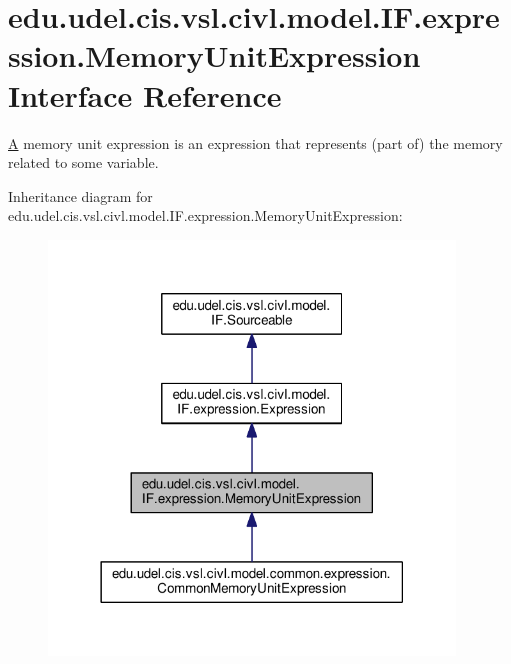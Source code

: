 \hypertarget{interfaceedu_1_1udel_1_1cis_1_1vsl_1_1civl_1_1model_1_1IF_1_1expression_1_1MemoryUnitExpression}{}\section{edu.\+udel.\+cis.\+vsl.\+civl.\+model.\+I\+F.\+expression.\+Memory\+Unit\+Expression Interface Reference}
\label{interfaceedu_1_1udel_1_1cis_1_1vsl_1_1civl_1_1model_1_1IF_1_1expression_1_1MemoryUnitExpression}


\hyperlink{structA}{A} memory unit expression is an expression that represents (part of) the memory related to some variable.  




Inheritance diagram for edu.\+udel.\+cis.\+vsl.\+civl.\+model.\+I\+F.\+expression.\+Memory\+Unit\+Expression\+:
\nopagebreak
\begin{figure}[H]
\begin{center}
\leavevmode
\includegraphics[width=306pt]{interfaceedu_1_1udel_1_1cis_1_1vsl_1_1civl_1_1model_1_1IF_1_1expression_1_1MemoryUnitExpression__inherit__graph}
\end{center}
\end{figure}


